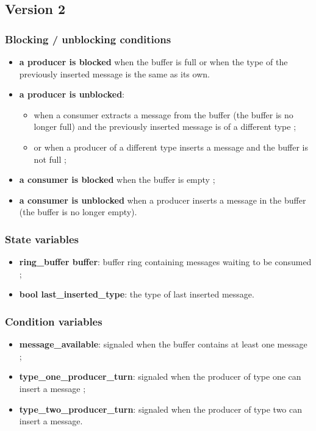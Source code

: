 \documentclass[a4paper, 12pt]{article}
\begin{document}
\pagebreak

\subsection{Version 2}

\subsubsection{Blocking / unblocking conditions}
\begin{itemize}
    \item \textbf{a producer is blocked} when the buffer is full or when the
        type of the previously inserted message is the same as its own.
    \item \textbf{a producer is unblocked}:
        \begin{itemize}
            \item when a consumer extracts a message from the buffer (the
                buffer is no longer full) and the previously inserted message
                is of a different type ;
            \item or when a producer of a different type inserts a message and
                the buffer is not full ;
        \end{itemize}
    \item \textbf{a consumer is blocked} when the buffer is empty ;
    \item \textbf{a consumer is unblocked} when a producer inserts a message in the
        buffer (the buffer is no longer empty).
\end{itemize}

\subsubsection{State variables}
\begin{itemize}
    \item \textbf{ring\_buffer buffer}: buffer ring containing messages waiting to be
        consumed ;
    \item \textbf{bool last\_inserted\_type}: the type of last inserted
        message.
\end{itemize}

\subsubsection{Condition variables}
\begin{itemize}
    \item \textbf{message\_available}: signaled when the buffer contains at
        least one message ;
    \item \textbf{type\_one\_producer\_turn}: signaled when the producer of type
        one can insert a message ;
    \item \textbf{type\_two\_producer\_turn}: signaled when the producer of type
        two can insert a message.
\end{itemize}
\end{document}

